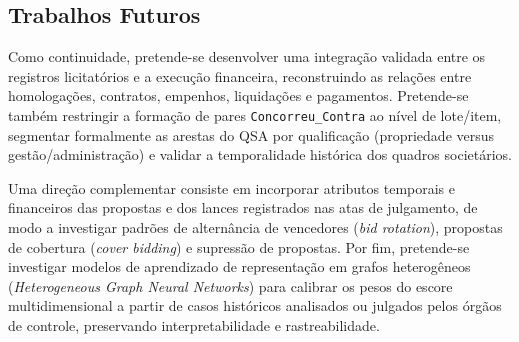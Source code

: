 \subsection{Trabalhos Futuros}

Como continuidade, pretende-se desenvolver uma integração validada entre os registros licitatórios e a execução financeira, reconstruindo as relações entre homologações, contratos, empenhos, liquidações e pagamentos. Pretende-se também restringir a formação de pares \texttt{Concorreu\_Contra} ao nível de lote/item, segmentar formalmente as arestas do QSA por qualificação (propriedade versus gestão/administração) e validar a temporalidade histórica dos quadros societários.

Uma direção complementar consiste em incorporar atributos temporais e financeiros das propostas e dos lances registrados nas atas de julgamento, de modo a investigar padrões de alternância de vencedores (\textit{bid rotation}), propostas de cobertura (\textit{cover bidding}) e supressão de propostas. Por fim, pretende-se investigar modelos de aprendizado de representação em grafos heterogêneos (\textit{Heterogeneous Graph Neural Networks}) para calibrar os pesos do escore multidimensional a partir de casos históricos analisados ou julgados pelos órgãos de controle, preservando interpretabilidade e rastreabilidade.
